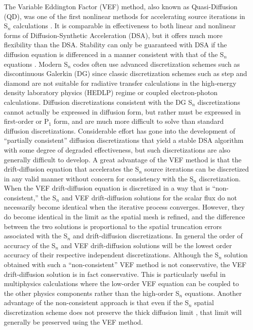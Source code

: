 The Variable Eddington Factor (VEF) method, also known as Quasi-Diffusion (QD), was one of the first nonlinear methods 
for accelerating source iterations in S$_n$ calculations \cite{*}.  It is comparable in effectiveness to both linear 
and nonlinear forms of Diffusion-Synthetic Acceleration (DSA), but it offers much more flexibility than the DSA.   
Stability can only be guaranteed with DSA if the diffusion equation is differenced in a manner consistent with that 
of the S$_n$ equations \cite{*}. Modern S$_n$ codes often use advanced discretization schemes such as discontinuous 
Galerkin (DG) since classic discretization schemes such as step and diamond are not suitable for radiative transfer 
calculations in the high-energy density laboratory physics (HEDLP) regime or coupled electron-photon calculations.  Diffusion discretizations consistent 
with the DG S$_n$ discretizations cannot actually be expressed in diffusion form, but rather must be expressed in 
first-order or P$_1$ form, and are much more difficult to solve than standard diffusion discretizations.   Considerable 
effort has gone into the development of ``partially consistent'' diffusion discretizations that yield a stable DSA 
algorithm with some degree of degraded effectiveness, but such discretizations are also generally difficult to develop. A 
great advantage of the VEF method is that the drift-diffusion equation that accelerates the S$_n$ source iterations can be 
discretized in any valid manner without concern for consistency with the S$_n$ discretization.  When the VEF 
drift-diffusion equation is discretized in a way that is ``non-consistent,'' the S$_n$ and VEF drift-diffusion solutions 
for the scalar flux do not necessarily become identical when the iterative process converges.  However, they do become 
identical in the limit as the spatial mesh is refined, and the difference between the two solutions is proportional to 
the spatial truncation errors associated with the S$_n$ and drift-diffusion discretizations.  In general the order of accuracy 
of the S$_n$ and VEF drift-diffusion solutions will be the lowest order accuracy of their respective independent
discretizations.  Although the S$_n$ solution obtained with such a ``non-consistent'' VEF method is not conservative, 
the VEF drift-diffusion solution is in fact conservative.  This is particularly useful in multiphysics calculations 
where the low-order VEF equation can be coupled to the other physics components rather than the high-order S$_n$ 
equations.  Another advantage of the non-consistent approach is that even if the S$_n$ spatial discretization 
scheme does not preserve the thick diffusion limit \cite{*}, that limit will generally be preserved using the VEF method. 
 
